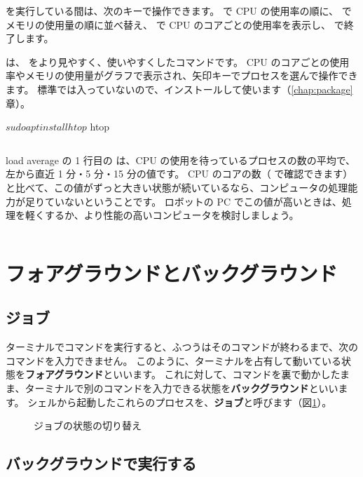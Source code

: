  を実行している間は、次のキーで操作できます。
 で CPU の使用率の順に、 でメモリの使用量の順に並べ替え、 で CPU のコアごとの使用率を表示し、 で終了します。

 は、 をより見やすく、使いやすくしたコマンドです。
CPU のコアごとの使用率やメモリの使用量がグラフで表示され、矢印キーでプロセスを選んで操作できます。
標準では入っていないので、インストールして使います（\ref{chap:package}章）。

\begin{terminal}
$ sudo apt install htop
$ htop
\end{terminal}

\begin{column}{load average}
   の 1 行目の  は、CPU の使用を待っているプロセスの数の平均で、左から直近 1 分・5 分・15 分の値です。
  CPU のコアの数（ で確認できます）と比べて、この値がずっと大きい状態が続いているなら、コンピュータの処理能力が足りていないということです。
  ロボットの PC でこの値が高いときは、処理を軽くするか、より性能の高いコンピュータを検討しましょう。
\end{column}

\section{フォアグラウンドとバックグラウンド}
\label{sec:process-job}

\subsection{ジョブ}

ターミナルでコマンドを実行すると、ふつうはそのコマンドが終わるまで、次のコマンドを入力できません。
このように、ターミナルを占有して動いている状態を\textbf{フォアグラウンド}といいます。
これに対して、コマンドを裏で動かしたまま、ターミナルで別のコマンドを入力できる状態を\textbf{バックグラウンド}といいます。
シェルから起動したこれらのプロセスを、\textbf{ジョブ}と呼びます（図\ref{fig:process-job}）。

\begin{figure}[tb]
  \centering
  
  \caption{ジョブの状態の切り替え}
  \label{fig:process-job}
\end{figure}

\subsection{バックグラウンドで実行する}

